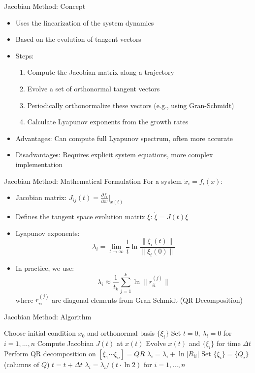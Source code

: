 \documentclass{beamer}
\begin{document}
\begin{frame}{Jacobian Method: Concept}
\begin{itemize}
    \item Uses the linearization of the system dynamics
    \item Based on the evolution of tangent vectors
    \item Steps:
    \begin{enumerate}
        \item Compute the Jacobian matrix along a trajectory
        \item Evolve a set of orthonormal tangent vectors
        \item Periodically orthonormalize these vectors (e.g., using Gran-Schmidt)
        \item Calculate Lyapunov exponents from the growth rates
    \end{enumerate}
    \item Advantages: Can compute full Lyapunov spectrum, often more accurate
    \item Disadvantages: Requires explicit system equations, more complex implementation
\end{itemize}
\end{frame}

\begin{frame}{Jacobian Method: Mathematical Formulation}
For a system $\dot{x}_i = f_i(x)$:
\begin{itemize}
    \item Jacobian matrix: $J_{ij}(t) = \frac{\partial f_i}{\partial x^j}\big|_{x(t)}$
    \item Defines the tangent space evolution matrix $\xi$: $\dot{\xi} = J(t)\xi$
    \item Lyapunov exponents:
    $$\lambda_i = \lim_{t\to\infty} \frac{1}{t} \ln \frac{\|\xi_i(t)\|}{\|\xi_i(0)\|}$$
    \item In practice, we use:
    $$\lambda_i \approx \frac{1}{t_k} \sum_{j=1}^k \ln \|r_{ii}^{(j)}\|$$
    where $r_{ii}^{(j)}$ are diagonal elements from Gran-Schmidt (QR Decomposition)
\end{itemize}
\end{frame}

\begin{frame}{Jacobian Method: Algorithm}
\begin{algorithm}[H]
\caption{Jacobian Method for Lyapunov Spectrum}
\begin{algorithmic}[1]
\State Choose initial condition $x_0$ and orthonormal basis $\{\xi_i\}$
\State Set $t = 0$, $\lambda_i = 0$ for $i = 1,\ldots,n$
    \State Compute Jacobian $J(t)$ at $x(t)$
    \State Evolve $x(t)$ and $\{\xi_i\}$ for time $\Delta t$
    \State Perform QR decomposition on $[\xi_1 \cdots \xi_n] = QR$
        \State $\lambda_i = \lambda_i + \ln |R_{ii}|$
    \EndFor
    \State Set $\{\xi_i\} = \{Q_i\}$ (columns of $Q$)
    \State $t = t + \Delta t$
\EndWhile
\State $\lambda_i = \lambda_i / (t \cdot \ln 2)$ for $i = 1,\ldots,n$
\end{algorithmic}
\end{algorithm}
\end{frame}
\end{document}
